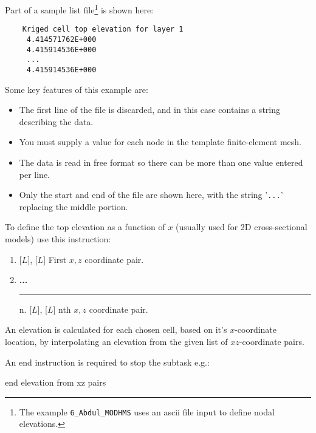 Part of a sample list file\footnote{The example \texttt{6\_Abdul\_MODHMS} uses an ascii file input to define nodal elevations.} is shown here:
    \begin{verbatim}
    Kriged cell top elevation for layer 1
     4.414571762E+000
     4.415914536E+000
     ...
     4.415914536E+000
     \end{verbatim}
     \squish
Some key features of this example are:
\begin{itemize}
  \item The first line of the file is discarded, and in this case contains a string describing the data.
  \item You must supply a value for each node in the template finite-element mesh.
  \item The data is read in free format so there can be more than one value entered per line.
  \item Only the start and end of the file are shown here, with the string '\texttt{...}' replacing the middle portion.
\end{itemize}

To define the top elevation as a function of $x$ (usually used for 2D cross-sectional models) use this instruction:

    {
    \squish
    \begin{enumerate}
    \item {} [$L$],  [$L$]  First $x, z$ coordinate pair.
    \item \textbf{...} \\
     \hspace*{-.27in}\rule{0.in}{.24in}  n.  [$L$],  [$L$]  nth $x, z$ coordinate pair.
    \end{enumerate}

     An elevation is calculated for each chosen cell, based on it's $x$-coordinate location, by interpolating an elevation from the given list of  $xz$-coordinate pairs.

    An end instruction is required to stop the subtask e.g.:

    {\Large \sf end elevation from xz pairs}
    }


